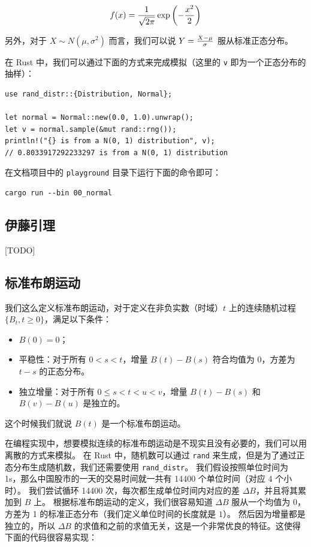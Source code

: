 \documentclass[utf8,a4paper,nofonts,9pt]{ctexbook}
\begin{document}
$$
f(x) = {1 \over \sqrt{2\pi}} \exp\left(-{x^2 \over 2}\right)
$$

另外，对于 $X \sim N(\mu, \sigma^2)$ 而言，我们可以说 $Y = {X - \mu \over \sigma}$ 服从标准正态分布。

在 Rust 中，我们可以通过下面的方式来完成模拟（这里的 \verb|v| 即为一个正态分布的抽样）：

\begin{lstlisting}
use rand_distr::{Distribution, Normal};

let normal = Normal::new(0.0, 1.0).unwrap();
let v = normal.sample(&mut rand::rng());
println!("{} is from a N(0, 1) distribution", v);
// 0.8033917292233297 is from a N(0, 1) distribution
\end{lstlisting}

在文档项目中的 \verb|playground| 目录下运行下面的命令即可：

\begin{lstlisting}
cargo run --bin 00_normal
\end{lstlisting}

\subsection{伊藤引理}
\label{title:ItosLemma}

[TODO]

\subsection{标准布朗运动}

我们这么定义标准布朗运动，对于定义在非负实数（时域）$t$ 上的连续随机过程 $\{B_t, t \ge 0\}$，满足以下条件：

\begin{itemize}
    \item $B(0) = 0$；
    \item 平稳性：对于所有 $0 < s < t$，增量 $B(t) - B(s)$ 符合均值为 $0$，方差为 $t - s$ 的正态分布。
    \item 独立增量：对于所有 $0 \le s < t < u < v$，增量 $B(t) - B(s)$ 和 $B(v) - B(u)$ 是独立的。
\end{itemize}

这个时候我们就说 $B(t)$ 是一个标准布朗运动。

在编程实现中，想要模拟连续的标准布朗运动是不现实且没有必要的，我们可以用离散的方式来模拟。
在 Rust 中，随机数可以通过 \verb|rand| 来生成，但是为了通过正态分布生成随机数，我们还需要使用 \verb|rand_distr|。
我们假设按照单位时间为 1s，那么中国股市的一天的交易时间就一共有 14400 个单位时间（对应 4 个小时）。
我们尝试循环 14400 次，每次都生成单位时间内对应的差 $\Delta B$，并且将其累加到 $B$ 上。
根据标准布朗运动的定义，我们很容易知道 $\Delta B$ 服从一个均值为 0，方差为 1 的标准正态分布（我们定义单位时间的长度就是 $1$）。
然后因为增量都是独立的，所以 $\Delta B$ 的求值和之前的求值无关，这是一个非常优良的特征。这使得下面的代码很容易实现：
\end{document}
